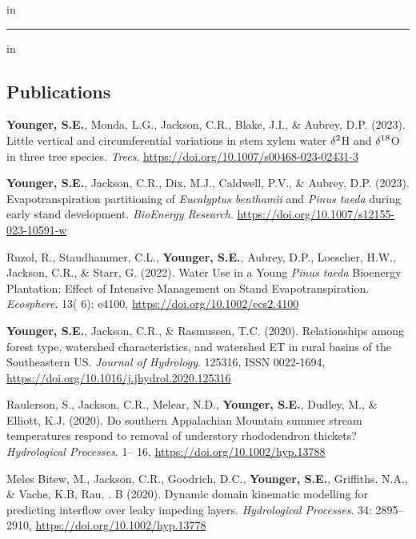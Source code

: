 \documentclass[10pt,letterpaper]{article}
\begin{document}
	\vspace{-0.4em}
	 in
	
	\hrule
	\vspace{-0.4em}
	 in
	\subsection*{Publications}
	
	\begin{hangparas}{.25in}{1}
		
		\textbf{Younger, S.E.}, Monda, L.G., Jackson, C.R., Blake, J.I., \& Aubrey, D.P. (2023). Little vertical and circumferential variations in stem xylem water $\delta$$\textsuperscript{2}$H and $\delta$$\textsuperscript{18}$O in three tree species. \textit{Trees}. \newline \url{https://doi.org/10.1007/s00468-023-02431-3}
		
		\textbf{Younger, S.E.}, Jackson, C.R., Dix, M.J., Caldwell, P.V., \& Aubrey, D.P. (2023). Evapotranspiration partitioning of \textit{Eucalyptus benthamii} and \textit{Pinus taeda} during early stand development. \textit{BioEnergy Research}. \url{https://doi.org/10.1007/s12155-023-10591-w}
		
		Ruzol, R., Staudhammer, C.L., \textbf{Younger, S.E.}, Aubrey, D.P., Loescher, H.W., Jackson, C.R., \& Starr, G. (2022). Water Use in a Young \textit{Pinus taeda} Bioenergy Plantation: Effect of Intensive Management on Stand Evapotranspiration. \textit{Ecosphere}. 13( 6): e4100, \url{https://doi.org/10.1002/ecs2.4100}
		
		\textbf{Younger, S.E.}, Jackson, C.R., \& Rasmussen, T.C. (2020). Relationships among forest type, watershed characteristics, and watershed ET in rural basins of the Southeastern US.
		\textit{Journal of Hydrology}. 125316, ISSN 0022-1694, \url{https://doi.org/10.1016/j.jhydrol.2020.125316}
		
		Raulerson, S., Jackson, C.R., Melear, N.D., \textbf{Younger, S.E.}, Dudley, M., \& Elliott, K.J. (2020). Do southern Appalachian Mountain summer stream temperatures respond to removal of understory rhododendron thickets? \textit{Hydrological Processes}. 1– 16, \url{https://doi.org/10.1002/hyp.13788}
		
		Meles Bitew, M., Jackson, C.R., Goodrich, D.C., \textbf{Younger, S.E.}, Griffiths. N.A., \& Vache, K.B, Rau, . B (2020). Dynamic domain kinematic modelling for predicting interflow over leaky impeding layers. \textit{Hydrological Processes}. 34: 2895– 2910, \url{https://doi.org/10.1002/hyp.13778}
		

\end{hangparas}
\end{document}
